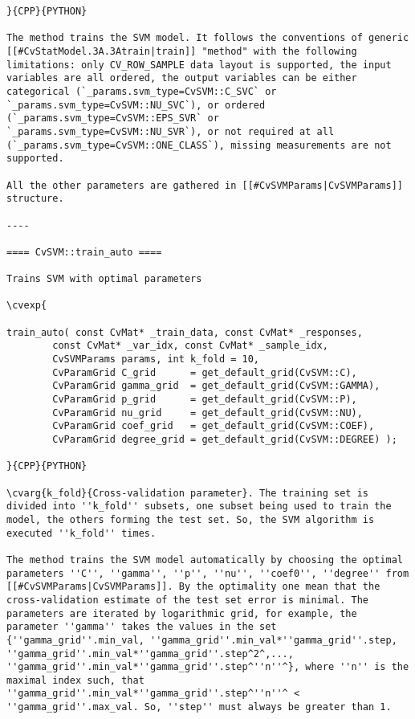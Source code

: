 \begin{verbatim}
}{CPP}{PYTHON}

The method trains the SVM model. It follows the conventions of generic [[#CvStatModel.3A.3Atrain|train]] "method" with the following limitations: only CV_ROW_SAMPLE data layout is supported, the input variables are all ordered, the output variables can be either categorical (`_params.svm_type=CvSVM::C_SVC` or `_params.svm_type=CvSVM::NU_SVC`), or ordered (`_params.svm_type=CvSVM::EPS_SVR` or `_params.svm_type=CvSVM::NU_SVR`), or not required at all (`_params.svm_type=CvSVM::ONE_CLASS`), missing measurements are not supported.

All the other parameters are gathered in [[#CvSVMParams|CvSVMParams]] structure.

----

==== CvSVM::train_auto ====

Trains SVM with optimal parameters

\cvexp{

train_auto( const CvMat* _train_data, const CvMat* _responses,
        const CvMat* _var_idx, const CvMat* _sample_idx,
        CvSVMParams params, int k_fold = 10,
        CvParamGrid C_grid      = get_default_grid(CvSVM::C),
        CvParamGrid gamma_grid  = get_default_grid(CvSVM::GAMMA),
        CvParamGrid p_grid      = get_default_grid(CvSVM::P),
        CvParamGrid nu_grid     = get_default_grid(CvSVM::NU),
        CvParamGrid coef_grid   = get_default_grid(CvSVM::COEF),
        CvParamGrid degree_grid = get_default_grid(CvSVM::DEGREE) );

}{CPP}{PYTHON}

\cvarg{k_fold}{Cross-validation parameter}. The training set is divided into ''k_fold'' subsets, one subset being used to train the model, the others forming the test set. So, the SVM algorithm is executed ''k_fold'' times.

The method trains the SVM model automatically by choosing the optimal parameters ''C'', ''gamma'', ''p'', ''nu'', ''coef0'', ''degree'' from [[#CvSVMParams|CvSVMParams]]. By the optimality one mean that the cross-validation estimate of the test set error is minimal. The parameters are iterated by logarithmic grid, for example, the parameter ''gamma'' takes the values in the set {''gamma_grid''.min_val, ''gamma_grid''.min_val*''gamma_grid''.step, ''gamma_grid''.min_val*''gamma_grid''.step^2^,..., ''gamma_grid''.min_val*''gamma_grid''.step^''n''^}, where ''n'' is the maximal index such, that ''gamma_grid''.min_val*''gamma_grid''.step^''n''^ < ''gamma_grid''.max_val. So, ''step'' must always be greater than 1.


\end{verbatim}
